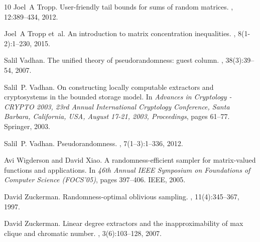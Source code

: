 \documentclass[10pt,a4paper]{article}
\newcommand{\1}{\mathbbm{1}}
\begin{document}
\begin{thebibliography}{10}
Joel~A Tropp.
\newblock User-friendly tail bounds for sums of random matrices.
, 12:389--434, 2012.

Joel~A Tropp et~al.
\newblock An introduction to matrix concentration inequalities.
,
  8(1-2):1--230, 2015.

Salil Vadhan.
\newblock The unified theory of pseudorandomness: guest column.
, 38(3):39--54, 2007.

Salil~P. Vadhan.
\newblock On constructing locally computable extractors and cryptosystems in
  the bounded storage model.
\newblock In {\em Advances in Cryptology - {CRYPTO} 2003, 23rd Annual
  International Cryptology Conference, Santa Barbara, California, USA, August
  17-21, 2003, Proceedings}, pages 61--77. Springer, 2003.

Salil~P. Vadhan.
\newblock Pseudorandomness.
, 7(1--3):1--336, 2012.

Avi Wigderson and David Xiao.
\newblock A randomness-efficient sampler for matrix-valued functions and
  applications.
\newblock In {\em 46th Annual IEEE Symposium on Foundations of Computer Science
  (FOCS'05)}, pages 397--406. IEEE, 2005.

David Zuckerman.
\newblock Randomness-optimal oblivious sampling.
, 11(4):345--367, 1997.

David Zuckerman.
\newblock Linear degree extractors and the inapproximability of max clique and
  chromatic number.
, 3(6):103--128, 2007.

\end{thebibliography}
\end{document}
